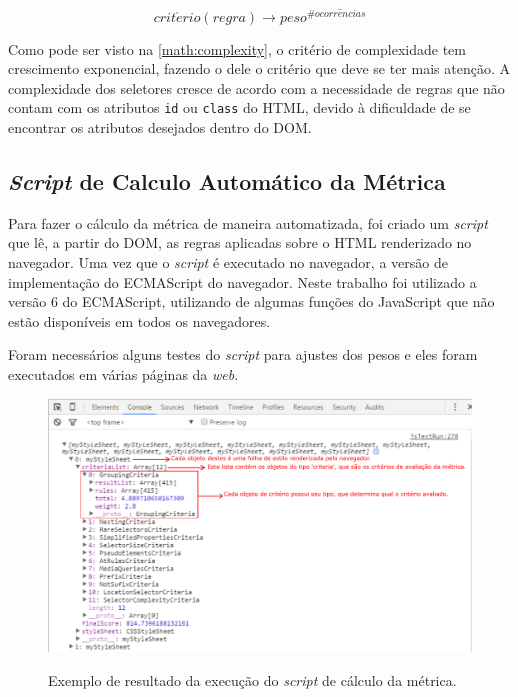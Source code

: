 \begin{equation}
\label{math:complexity}
	crit\acute{e}rio(regra) \rightarrow peso^{\#ocorr\hat{e}ncias}
\end{equation}

Como pode ser visto na \autoref{math:complexity}, o critério de complexidade tem crescimento exponencial, fazendo o dele o critério que deve se ter mais atenção. A complexidade dos seletores cresce de acordo com a necessidade de regras que não contam com os atributos \texttt{id} ou \texttt{class} do HTML, devido à dificuldade de se encontrar os atributos desejados dentro do DOM.

\subsection{\textit{Script} de Calculo Automático da Métrica}

Para fazer o cálculo da métrica de maneira automatizada, foi criado um \textit{script} que lê, a partir do DOM, as regras aplicadas sobre o HTML renderizado no navegador. Uma vez que o \textit{script} é executado no navegador, a versão de implementação do ECMAScript do navegador. Neste trabalho foi utilizado a versão 6 do ECMAScript, utilizando de algumas funções do JavaScript que não estão disponíveis em todos os navegadores.

Foram necessários alguns testes do \textit{script} para ajustes dos pesos e eles foram executados em várias páginas da \textit{web}.

\begin{figure}[!htb]
	\centering
	\caption{Exemplo de resultado da execução do \textit{script} de cálculo da métrica.}
	\includegraphics[width=1\textwidth]{./04-figuras/calculator}
	\label{fig:calculatorTest}
\end{figure}

